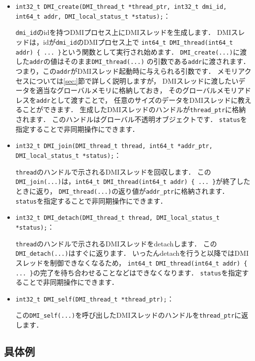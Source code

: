 \documentclass[report,12pt]{jsbook}
\begin{document}
\begin{itemize}
\item \texttt{int32\_t DMI\_create(DMI\_thread\_t *thread\_ptr, int32\_t dmi\_id, int64\_t addr, DMI\_local\_status\_t *status);}：
  
  \texttt{dmi\_id}のidを持つDMIプロセス上にDMIスレッドを生成します．
  DMIスレッドは，idが\texttt{dmi\_id}のDMIプロセス上で
  \texttt{int64\_t DMI\_thread(int64\_t addr) \{ ... \}}という関数として実行され始めます．
  \texttt{DMI\_create(...)}に渡した\texttt{addr}の値はそのまま\texttt{DMI\_thread(...)}
  の引数である\texttt{addr}に渡されます．
  つまり，この\texttt{addr}がDMIスレッド起動時に与えられる引数です．
  メモリアクセスについては\ref{sec:}節で詳しく説明しますが，
  DMIスレッドに渡したいデータを適当なグローバルメモリに格納しておき，
  そのグローバルメモリアドレスを\texttt{addr}として渡すことで，
  任意のサイズのデータをDMIスレッドに教えることができます．
  生成したDMIスレッドのハンドルが\texttt{thread\_ptr}に格納されます．
  このハンドルはグローバル不透明オブジェクトです．
  \texttt{status}を指定することで非同期操作にできます．
\item \texttt{int32\_t DMI\_join(DMI\_thread\_t thread, int64\_t *addr\_ptr, DMI\_local\_status\_t *status);}：
  
  \texttt{thread}のハンドルで示されるDMIスレッドを回収します．
  この\texttt{DMI\_join(...)}は，\texttt{int64\_t DMI\_thread(int64\_t addr) \{ ... \}}が終了したときに返り，
  \texttt{DMI\_thread(...)}の返り値が\texttt{addr\_ptr}に格納されます．
  \texttt{status}を指定することで非同期操作にできます．
\item \texttt{int32\_t DMI\_detach(DMI\_thread\_t thread, DMI\_local\_status\_t *status);}：
  
  \texttt{thread}のハンドルで示されるDMIスレッドをdetachします．
  この\texttt{DMI\_detach(...)}はすぐに返ります．
  いったんdetachを行うと以降ではDMIスレッドを制御できなくなるため，
  \texttt{int64\_t DMI\_thread(int64\_t addr) \{ ... \}}の完了を待ち合わせることなどはできなくなります．
  \texttt{status}を指定することで非同期操作にできます．
\item \texttt{int32\_t DMI\_self(DMI\_thread\_t *thread\_ptr);}：
  
  この\texttt{DMI\_self(...)}を呼び出したDMIスレッドのハンドルを\texttt{thread\_ptr}に返します．
\end{itemize}

\subsection{具体例}
\end{document}
